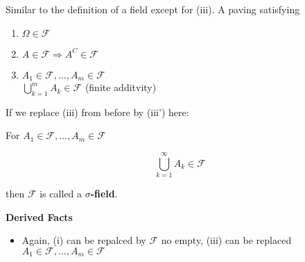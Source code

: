 \documentclass[11pt,fleqn]{book} %
\begin{document}
\begin{definition} Similar to the definition of a field except for (iii). A paving satisfying 
	\begin{enumerate}[label = (\roman*)]
		\item $\Omega \in \mathcal{F}$
		\item $A \in \mathcal{F} \Rightarrow A^C \in \mathcal{F}$
		\item $A_1 \in \mathcal{F}, \dots, A_m \in \mathcal{F} $\\ $\displaystyle\bigcup_{k=1}^m A_k \in \mathcal{F}$ (finite additvity)
	\end{enumerate}
\vspace{5mm}

If we replace (iii) from before by (iii') here:

For $A_1 \in \mathcal{F}, \dots, A_m \in \mathcal{F}$ 

$$\bigcup_{k=1}^\infty A_k \in \mathcal{F}$$

then $\mathcal{F}$ is called a $\sigma$\textbf{-field}. 
\end{definition}


	


\textbf{Derived Facts}

\begin{itemize}
	\item Again, (i) can be repalced by $\mathcal{F}$ no empty, 
				(iii) can be replaced  $A_1 \in \mathcal{F}, \dots, A_m \in \mathcal{F} $
\end{itemize}
\end{document}

